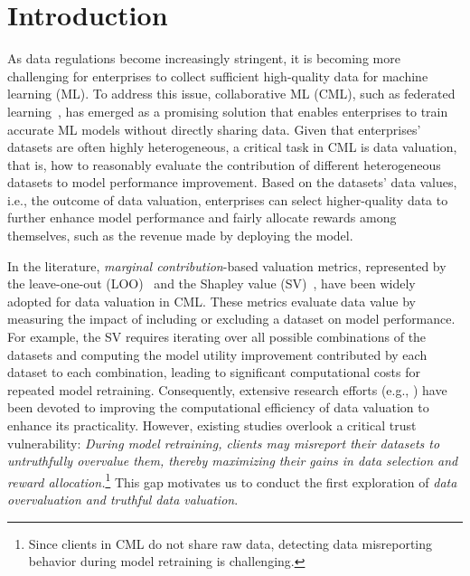\section{Introduction}

As data regulations become increasingly stringent, it is becoming more challenging for enterprises to collect sufficient high-quality data for machine learning (ML). 
To address this issue, collaborative ML (CML), such as federated learning~\citep{mcmahan2017communication}, has emerged as a promising solution that enables enterprises to train accurate ML models without directly sharing data. 
Given that enterprises' datasets are often highly heterogeneous, a critical task in CML is data valuation, that is, how to reasonably evaluate the contribution of different heterogeneous datasets to model performance improvement. 
Based on the datasets' data values, i.e., the outcome of data valuation, enterprises can select higher-quality data to further enhance model performance and fairly allocate rewards among themselves, such as the revenue made by deploying the model.

In the literature, \textit{marginal contribution}-based valuation metrics, represented by the leave-one-out (LOO)~\citep{cook1977detection} and the Shapley value (SV)~\citep{shapley1953value}, have been widely adopted for data valuation in CML. 
These metrics evaluate data value by measuring the impact of including or excluding a dataset on model performance. 
For example, the SV requires iterating over all possible combinations of the datasets and computing the model utility improvement contributed by each dataset to each combination, leading to significant computational costs for repeated model retraining. 
Consequently, extensive research efforts (e.g., \citep{ghorbani2019data, jia2019towards, jia2019efficient, kwon2021efficient}) have been devoted to improving the computational efficiency of data valuation to enhance its practicality.
However, existing studies overlook a critical trust vulnerability: \textit{During model retraining, clients may misreport their datasets to untruthfully overvalue them, thereby maximizing their gains in data selection and reward allocation.}\footnote{Since clients in CML do not share raw data, detecting data misreporting behavior during model retraining is challenging.}
This gap motivates us to conduct the first exploration of \textit{data overvaluation and truthful data valuation}.

